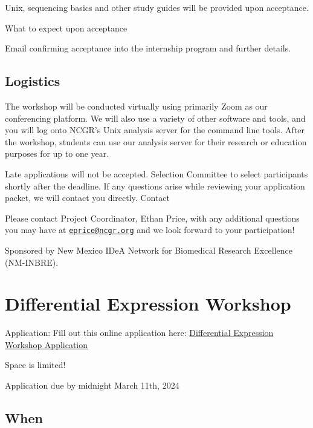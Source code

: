 \documentclass[
]{book}
\begin{document}
Unix, sequencing basics and other study guides will be provided upon acceptance.

What to expect upon acceptance

Email confirming acceptance into the internship program and further details.

\hypertarget{logistics-2}{%
\section*{Logistics}\label{logistics-2}}

The workshop will be conducted virtually using primarily Zoom as our conferencing platform. We will also use a variety of other software and tools, and you will log onto NCGR's Unix analysis server for the command line tools. After the workshop, students can use our analysis server for their research or education purposes for up to one year.

Late applications will not be accepted. Selection Committee to select participants shortly after the deadline. If any questions arise while reviewing your application packet, we will contact you directly.
Contact

Please contact Project Coordinator, Ethan Price, with any additional questions you may have at \href{mailto:eprice@ncgr.org}{\nolinkurl{eprice@ncgr.org}} and we look forward to your participation!

Sponsored by New Mexico IDeA Network for Biomedical Research Excellence (NM-INBRE).

\hypertarget{differential-expression-workshop}{%
\chapter*{Differential Expression Workshop}\label{differential-expression-workshop}}

Application: Fill out this online application here:
\href{https://docs.google.com/forms/d/e/1FAIpQLScpoKxE0yAnCK3yOl5hBde7MtOWCOeXYxvjBfWyDcA9hHDGrw/viewform}{Differential Expression Workshop Application}

Space is limited!

Application due by midnight March 11th, 2024

\hypertarget{when-4}{%
\section*{When}\label{when-4}}
\end{document}
